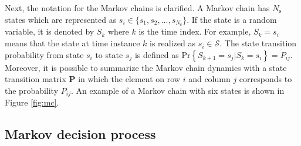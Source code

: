 \documentclass[english, 12pt, a4paper, elec, utf8, a-1b, online]{aaltothesis}
\numberwithin{equation}{section}
\renewcommand{\vec}[1]{\mathbf{#1}}
\newcommand{\Ss}{\mathcal{S}}
\renewcommand{\Pr}[1]{\text{Pr}\left\{ #1 \right\}}
\newcommand{\stprobs}{\vec{P}}
\newcommand{\nstates}{{N_\text{s}}}
\begin{document}
Next, the notation for the Markov chains is clarified.
A Markov chain has $\nstates$ states which are represented as $s_i \in \{s_1, s_2, ..., s_{\nstates} \}$.
If the state is a random variable, it is denoted by $S_k$ where $k$ is the time index.
For example, $S_k = s_i$ means that the state at time instance $k$ is realized as $s_i \in \Ss$. 
The state transition probability from state $s_i$ to state $s_j$ is defined as $\Pr{S_{k+1}=s_j | S_{k}=s_i}=P_{ij}$.
Moreover, it is possible to summarize the Markov chain dynamics with a state transition matrix $\stprobs$ in which the element on row $i$ and column $j$ corresponds to the probability $P_{ij}$.
An example of a Markov chain with six states is shown in Figure \ref{fig:mc}.

\subsection{Markov decision process} \label{sec:MDP}
\end{document}
